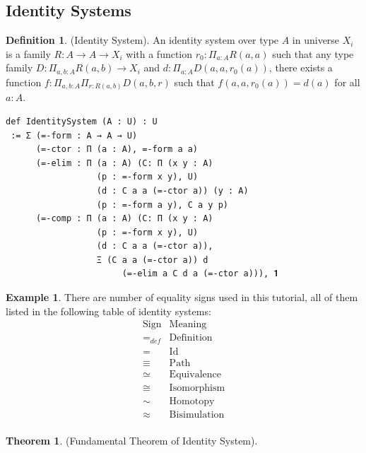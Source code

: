 \documentclass{article}
\theoremstyle{definition}
\newtheorem{definition}{Definition}
\newtheorem{theorem}{Theorem}
\newtheorem{example}{Example}
\begin{document}
\subsection{Identity Systems}
\begin{definition} (Identity System).
An identity system over type $A$ in universe $X_i$ is a
family $R : A \rightarrow A \rightarrow X_i$ with a function
$r_0: \Pi_{a:A}R(a,a)$ such that any type family
$D : \Pi_{a,b:A}R(a,b) \rightarrow X_i$ and
$d: \Pi_{a:A}D(a,a,r_0(a))$, there exists a function
$f: \Pi_{a,b:A}\Pi_{r:R(a,b)}D(a,b,r)$ such that
$f(a,a,r_0(a))=d(a)$ for all $a:A$.
\begin{lstlisting}
def IdentitySystem (A : U) : U
 := Σ (=-form : A → A → U)
      (=-ctor : Π (a : A), =-form a a)
      (=-elim : Π (a : A) (C: Π (x y : A)
                  (p : =-form x y), U)
                  (d : C a a (=-ctor a)) (y : A)
                  (p : =-form a y), C a y p)
      (=-comp : Π (a : A) (C: Π (x y : A)
                  (p : =-form x y), U)
                  (d : C a a (=-ctor a)),
                  Ξ (C a a (=-ctor a)) d
                       (=-elim a C d a (=-ctor a))), 𝟏
\end{lstlisting}
\end{definition}

\begin{example}
There are number of equality signs used in this tutorial,
all of them listed in the following table of identity systems:
$$
\begin{array}{ll} \mathrm{Sign} & \mathrm{Meaning} \\
                         \hline
                        =_{def} & \mathrm{Definition} \\
                              = & \mathrm{Id} \\
                         \equiv & \mathrm{Path} \\
                         \simeq & \mathrm{Equivalence} \\
                          \cong & \mathrm{Isomorphism} \\
                           \sim & \mathrm{Homotopy} \\
                        \approx & \mathrm{Bisimulation} \\
                      \end{array}
$$
\end{example}

\begin{theorem} (Fundamental Theorem of Identity System).
\end{theorem}
\end{document}
